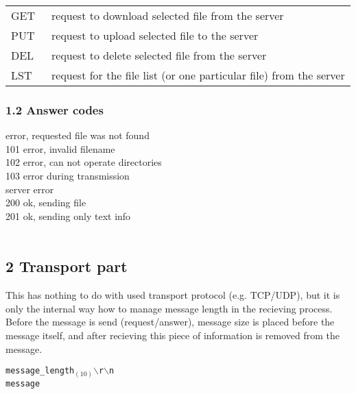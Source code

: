 \documentclass[11pt,a4paper]{article}
\newcommand{\bs}{$\backslash$}
\begin{document}
\par
\begingroup
\leftskip=0.6cm
\noindent
\begin{tabular}{ll}
	GET &\ request to download selected file from the server \\
	PUT &\ request to upload selected file to the server \\
	DEL &\ request to delete selected file from the server \\
	LST &\ request for the file list (or one particular file) from the server\\
\end{tabular}
\par
\endgroup

\subsubsection*{1.2 Answer codes}
\par
\begingroup
\leftskip=0.8cm
\begin{multicols}{2}
	 \quad error, requested file was not found \\
	101 \quad error, invalid filename \\
	102 \quad error, can not operate directories \\
	103 \quad error during transmission \\

	 \quad server error \\
	200 \quad ok, sending file \\
	201 \quad ok, sending only text info
	\\
	\\
\end{multicols}
\par
\endgroup

\vspace{-0.8cm}

\subsection*{2 Transport part}

This has nothing to do with used transport protocol (e.g. TCP/UDP), but it is only the internal
way how to manage message length in the recieving process.
Before the message is send (request/answer), message size is placed before the message itself,
and after recieving this piece of information is removed from the message. \\

\par
\begingroup
\leftskip=0.8cm
\noindent
\texttt{message\_length}$_{(10)}$\bs \texttt{r}\bs \texttt{n} \\
\texttt{message}
\par
\endgroup
\end{document}
